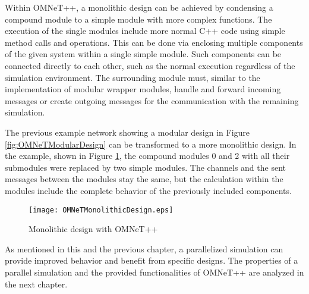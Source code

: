 Within OMNeT++, a monolithic design can be achieved by condensing a compound module to a simple module with more complex functions.
The execution of the single modules include more normal C++ code using simple method calls and operations.
This can be done via enclosing multiple components of the given system within a single simple module.
Such components can be connected directly to each other, such as the normal execution regardless of the simulation environment.
The surrounding module must, similar to the implementation of modular wrapper modules, handle and forward incoming messages or create outgoing messages for the communication with the remaining simulation.

The previous example network showing a modular design in Figure \ref{fig:OMNeTModularDesign} can be transformed to a more monolithic design.
In the example, shown in Figure \ref{fig:OMNeTMonolithicDesign}, the compound modules 0 and 2 with all their submodules were replaced by two simple modules.
The channels and the sent messages between the modules stay the same, but the calculation within the modules include the complete behavior of the previously included components.

\begin{figure}
    \centering
    \texttt{[image: OMNeTMonolithicDesign.eps]}
    \caption{Monolithic design with OMNeT++}
    \label{fig:OMNeTMonolithicDesign}
\end{figure}

As mentioned in this and the previous chapter, a parallelized simulation can provide improved behavior and benefit from specific designs.
The properties of a parallel simulation and the provided functionalities of OMNeT++ are analyzed in the next chapter.